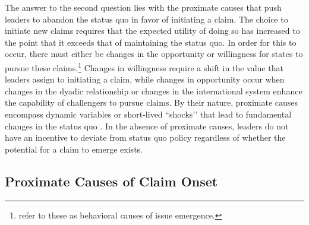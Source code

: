 

The answer to the second question lies with the proximate causes that push leaders to abandon the status quo in favor of initiating a claim. The choice to initiate new claims requires that the expected utility of doing so has increased to the point that it exceeds that of maintaining the status quo. In order for this to occur, there must either be changes in the opportunity or willingness for states to pursue these claims.\footnote{\citet{mansbach1981} refer to these as behavioral causes of issue emergence.} Changes in willingness require a shift in the value that leaders assign to initiating a claim, while changes in opportunity occur when changes in the dyadic relationship or changes in the international system enhance the capability of challengers to pursue claims. By their nature, proximate causes encompass dynamic variables or short-lived ``shocks’’ that lead to fundamental changes in the status quo \citep[see, e.g.,][]{goertz1995}. In the absence of proximate causes, leaders do not have an incentive to deviate from status quo policy regardless of whether the potential for a claim to emerge exists.



\subsection{Proximate Causes of Claim Onset}


